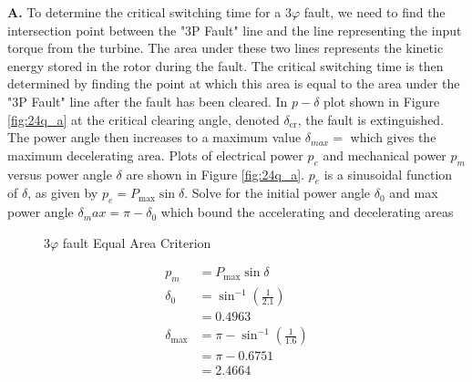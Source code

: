\documentclass[main.tex]{subfiles}
\begin{document}
\begin{enumerate}
\textbf{A.} To determine the critical switching time for a $3 \varphi$ fault, we need to find the intersection point between the "3P Fault" line and the line representing the input torque from the turbine. The area under these two lines represents the kinetic energy stored in the rotor during the fault. The critical switching time is then determined by finding the point at which this area is equal to the area under the "3P Fault" line after the fault has been cleared. In $p-\delta$ plot shown in Figure \ref{fig:24q_a} at the critical clearing angle, denoted $\delta_{\mathrm{cr}}$, the fault is extinguished. The power angle then increases to a maximum value $\delta_{max} =$ which gives the maximum decelerating area. Plots of electrical power $p_e$ and mechanical power $p_m$ versus power angle $\delta$ are shown in Figure \ref{fig:24q_a}. $p_e$ is a sinusoidal function of $\delta$, as given by $p_e = P_{\max } \sin \delta$. Solve for the initial power angle $\delta_0$ and max power angle $\delta_max = \pi-\delta_0$ which bound the accelerating and decelerating areas

\begin{figure}
\centering{}
\caption{$3 \varphi$ fault Equal Area Criterion}
\label{fig:24a_a}
\end{figure}

$$
\begin{aligned}
p_m &= P_{\max} \sin \delta\\
\delta_0 &= \sin^{-1}\left(\frac{1}{2.1}\right)\\
&= 0.4963\\
\delta_{\max} &= \pi - \sin^{-1}\left(\frac{1}{1.6}\right)\\
&= \pi - 0.6751\\
&= 2.4664
\end{aligned}
$$


\end{enumerate}
\end{document}
